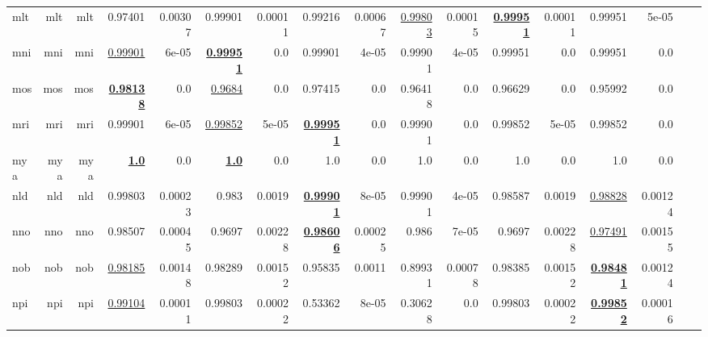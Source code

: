 \documentclass[11pt]{article}
\begin{document}
\begin{table*}[h]
{\begin{tabular}{lrrrrrrrrrrrrrrrr}
mlt         & mlt         & mlt         & 0.97401         & 0.00307         & 0.99901         & 0.00011         & 0.99216         & 0.00067         & \underline{0.99803}         & 0.00015         & \textbf{\underline{0.99951}}         & 0.00011         & 0.99951         & 5e-05         \\
mni         & mni         & mni         & \underline{0.99901}         & 6e-05         & \textbf{\underline{0.99951}}         & 0.0         & 0.99901         & 4e-05         & 0.99901         & 4e-05         & 0.99951         & 0.0         & 0.99951         & 0.0         \\
mos         & mos         & mos         & \textbf{\underline{0.98138}}         & 0.0         & \underline{0.9684}         & 0.0         & 0.97415         & 0.0         & 0.96418         & 0.0         & 0.96629         & 0.0         & 0.95992         & 0.0         \\
mri         & mri         & mri         & 0.99901         & 6e-05         & \underline{0.99852}         & 5e-05         & \textbf{\underline{0.99951}}         & 0.0         & 0.99901         & 0.0         & 0.99852         & 5e-05         & 0.99852         & 0.0         \\
mya         & mya         & mya         & \textbf{\underline{1.0}}         & 0.0         & \textbf{\underline{1.0}}         & 0.0         & 1.0         & 0.0         & 1.0         & 0.0         & 1.0         & 0.0         & 1.0         & 0.0         \\
nld         & nld         & nld         & 0.99803         & 0.00023         & 0.983         & 0.0019         & \textbf{\underline{0.99901}}         & 8e-05         & 0.99901         & 4e-05         & 0.98587         & 0.0019         & \underline{0.98828}         & 0.00124         \\
nno         & nno         & nno         & 0.98507         & 0.00045         & 0.9697         & 0.00228         & \textbf{\underline{0.98606}}         & 0.00025         & 0.986         & 7e-05         & 0.9697         & 0.00228         & \underline{0.97491}         & 0.00155         \\
nob         & nob         & nob         & \underline{0.98185}         & 0.00148         & 0.98289         & 0.00152         & 0.95835         & 0.0011         & 0.89931         & 0.00078         & 0.98385         & 0.00152         & \textbf{\underline{0.98481}}         & 0.00124         \\
npi         & npi         & npi         & \underline{0.99104}         & 0.00011         & 0.99803         & 0.00022         & 0.53362         & 8e-05         & 0.30628         & 0.0         & 0.99803         & 0.00022         & \textbf{\underline{0.99852}}         & 0.00016         \\

\end{tabular}}
\end{table*}
\end{document}

